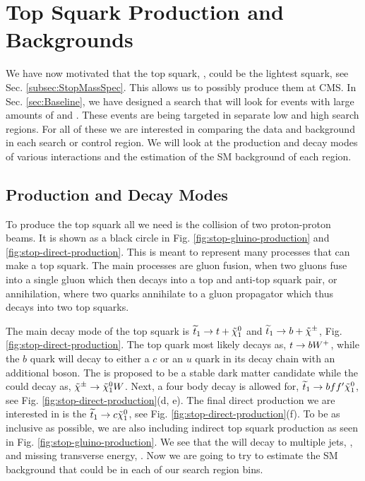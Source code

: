 \chapter{Top Squark Production and Backgrounds}
\label{ch:Search}

We have now motivated that the top squark, \st{}, could be the lightest squark, see Sec. \ref{subsec:StopMassSpec}. This allows us to possibly produce them at CMS. In Sec. \ref{sec:Baseline}, we have designed a search that will look for events with large amounts of \met{} and \nj. These events are being targeted in separate low \dm{} and high \dm{} search regions. For all of these we are interested in comparing the data and background in each search or control region. We will look at the production and decay modes of various \st{} interactions and the estimation of the SM background of each region. 

\section{Production and Decay Modes}
\label{sec:Production}

To produce the top squark all we need is the collision of two proton-proton beams. It is shown as a black circle in Fig. \ref{fig:stop-gluino-production} and \ref{fig:stop-direct-production}. This is meant to represent many processes that can make a top squark. The main processes are gluon fusion, when two gluons fuse into a single gluon which then decays into a top and anti-top squark pair, or annihilation, where two quarks annihilate to a gluon propagator which thus decays into two top squarks. 



The main decay mode of the top squark is $\widetilde{t}_1\rightarrow t+\tilde{\chi}^{0}_{1}$ and $\widetilde{t}_1\rightarrow b+\tilde{\chi}^{\pm}$, Fig. \ref{fig:stop-direct-production}. The top quark most likely decays as, $t\rightarrow bW^+$, while the $b$ quark will decay to either a $c$ or an $u$ quark in its decay chain with an additional \W{} boson. The \neutralino{} is proposed to be a stable dark matter candidate while the \chargino{} could decay as, $\tilde{\chi}^{\pm}\rightarrow\tilde{\chi}^{0}_{1}W$. Next, a four body decay is allowed for, $\widetilde{t}_1\rightarrow b f f^\prime \tilde{\chi}^{0}_{1}$, see Fig. \ref{fig:stop-direct-production}(d, e). The final direct \st{} production we are interested in is the $\widetilde{t}_1\rightarrow c\tilde{\chi}^{0}_{1}$, see Fig. \ref{fig:stop-direct-production}(f). To be as inclusive as possible, we are also including indirect top squark production \cite{cms_collaboration_search_2013} as seen in Fig. \ref{fig:stop-gluino-production}. We see that the \st{} will decay to multiple jets, \nj, and missing transverse energy, \met. Now we are going to try to estimate the SM background that could be in each of our search region bins.

